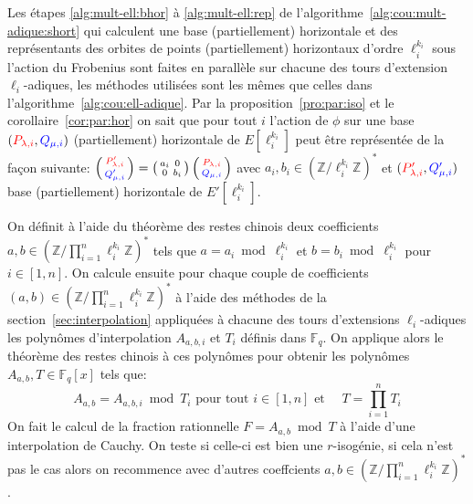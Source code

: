 \documentclass[10pt,a4paper]{book}
\theoremstyle{plain}
\theoremstyle{definition}
\theoremstyle{definition}
\theoremstyle{definition}
\theoremstyle{definition}
\theoremstyle{remark}
\theoremstyle{remark}
\theoremstyle{definition}
\begin{document}
Les étapes \ref{alg:mult-ell:bhor} à \ref{alg:mult-ell:rep} de 
l'algorithme~\ref{alg:cou:mult-adique:short} qui calculent une base (partiellement) 
horizontale et des représentants des orbites de points (partiellement) 
horizontaux d'ordre $\ell_i^{k_i}$ sous l'action du Frobenius sont faites en 
parallèle sur chacune des tours d'extension $\ell_i$-adiques, les méthodes 
utilisées sont les mêmes que celles dans l'algorithme~\ref{alg:cou:ell-adique}.
Par la proposition~\ref{pro:par:iso} et le corollaire~\ref{cor:par:hor} on sait
 que pour tout $i$ l'action de $\phi$ sur une base
$(\color{red}P_{\lambda,i}\color{black},\color{blue}Q_{\mu,i}\color{black})$
 (partiellement) horizontale de $E[\ell_i^{k_i}]$ peut être représentée de la façon suivante:
$
\left(\begin{smallmatrix}
\color{red} P'_{\lambda,i} \\
\color{blue} Q'_{\mu,i} \color{black}
\end{smallmatrix} \right)= \left(\begin{smallmatrix}
a_i & 0 \\
0 & b_i\end{smallmatrix} \right)
\left(\begin{smallmatrix}
\color{red} P_{\lambda,i} \\
\color{blue} Q_{\mu,i} \color{black} \end{smallmatrix} \right)$
avec $ a_i,b_i \in \left( \mathbb{Z}/\ell_i^{k_i}\mathbb{Z} \right)^*$ et 
$(\color{red}P'_{\lambda,i}\color{black},\color{blue}Q'_{\mu,i}\color{black})$
base (partiellement) horizontale de $E'[\ell_i^{k_i}]$.

On définit à l'aide du théorème des restes chinois deux coefficients $a,b \in 
\left( \mathbb{Z}/\prod_{i=1}^n\ell_i^{k_i} \mathbb{Z} \right)^*$ tels que 
$a=a_i \bmod \ell_i^{k_i}$ et $b=b_i \bmod \ell_i^{k_i}$ pour $i\in [1,n]$.
On calcule ensuite pour chaque couple de coefficients 
$(a,b) \in (\mathbb{Z}/\prod_{i=1}^n\ell_i^{k_i}\mathbb{Z})^*$ à l'aide des 
méthodes de la section~\ref{sec:interpolation} appliquées
à chacune des tours d'extensions $\ell_i$-adiques les polynômes 
d'interpolation $A_{a,b,i}$ et $T_i$ définis dans $\mathbb{F}_q$.
 On applique alors le théorème des restes chinois à ces polynômes pour obtenir 
 les polynômes $A_{a,b},T \in \mathbb{F}_q[x]$ tels que:
 \[
A_{a,b}=A_{a,b,i} \bmod T_i \text{ pour tout } i \in [1,n] \text{ et } \quad T=\prod_{i=1}^nT_i 
 \]
On fait le calcul de la fraction rationnelle $F=A_{a,b} \bmod T$ à l'aide d'une
interpolation de Cauchy. On teste si celle-ci est bien une $r$-isogénie,
si cela n'est pas le cas alors on recommence avec d'autres coeffcients $a,b \in 
(\mathbb{Z}/\prod_{i=1}^n\ell_i^{k_i} \mathbb{Z})^*$.
\end{document}
